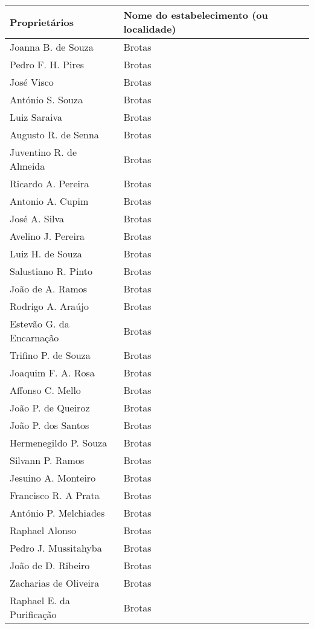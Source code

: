 \begin{table}[!htp]
{
\begin{tiny}
\begin{tabular}{ll}
\toprule
Proprietários & Nome do estabelecimento (ou localidade) \\
\midrule
\midrule
Joanna B. de Souza  & Brotas \\
Pedro F. H. Pires  & Brotas \\
José Visco  & Brotas \\
António S. Souza  & Brotas \\
Luiz Saraiva  & Brotas \\
Augusto R. de Senna  & Brotas \\
Juventino R. de Almeida  & Brotas \\
Ricardo A. Pereira  & Brotas \\
Antonio A. Cupim & Brotas \\
José A. Silva & Brotas \\
Avelino J. Pereira & Brotas \\
Luiz H. de Souza & Brotas \\
Salustiano R. Pinto & Brotas \\
João de A. Ramos & Brotas \\
Rodrigo A. Araújo & Brotas \\
Estevão G. da Encarnação & Brotas \\
Trifino P. de Souza & Brotas \\
Joaquim F. A. Rosa & Brotas \\
Affonso C. Mello & Brotas \\
João P. de Queiroz & Brotas \\
João P. dos Santos & Brotas \\
Hermenegildo P. Souza & Brotas \\
Silvann P. Ramos & Brotas \\
Jesuino A. Monteiro & Brotas \\
Francisco R. A Prata & Brotas \\
António P. Melchiades & Brotas \\
Raphael Alonso & Brotas \\
Pedro J. Mussitahyba & Brotas \\
João de D. Ribeiro & Brotas \\
Zacharias de Oliveira & Brotas \\
Raphael E. da Purificação & Brotas \\

\end{tabular}
\end{tiny}}
\end{table}
